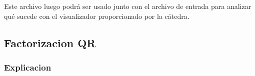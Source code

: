 Este archivo luego podrá ser usado junto con el archivo de entrada para analizar qué sucede con el visualizador proporcionado por la cátedra.


\subsection{Factorizacion QR}

\subsubsection{Explicacion}







